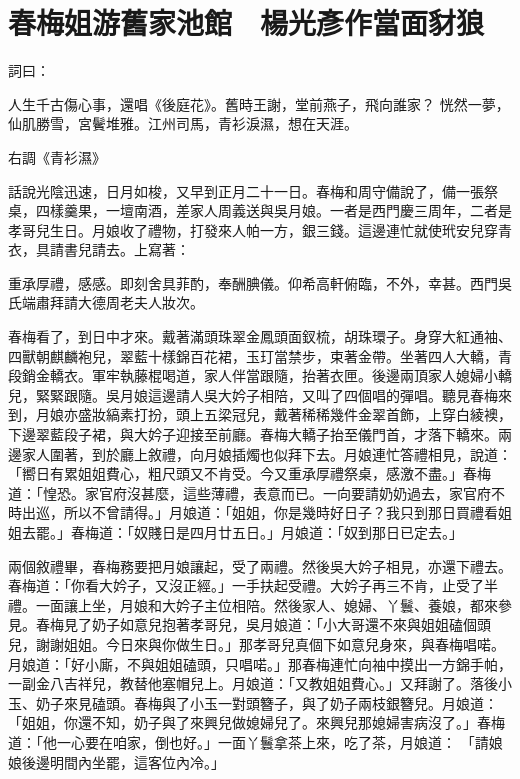 %

\chapter{春梅姐游舊家池館　楊光彥作當面豺狼}

詞曰：

人生千古傷心事，還唱《後庭花》。舊時王謝，堂前燕子，飛向誰家？
恍然一夢，仙肌勝雪，宮鬢堆雅。江州司馬，青衫淚濕，想在天涯。

右調《青衫濕》

話說光陰迅速，日月如梭，又早到正月二十一日。春梅和周守備說了，備一張祭桌，四樣羹果，一壇南酒，差家人周義送與吳月娘。一者是西門慶三周年，二者是孝哥兒生日。月娘收了禮物，打發來人帕一方，銀三錢。這邊連忙就使玳安兒穿青衣，具請書兒請去。上寫著：

重承厚禮，感感。即刻舍具菲酌，奉酬腆儀。仰希高軒俯臨，不外，幸甚。西門吳氏端肅拜請大德周老夫人妝次。

春梅看了，到日中才來。戴著滿頭珠翠金鳳頭面釵梳，胡珠環子。身穿大紅通袖、四獸朝麒麟袍兒，翠藍十樣錦百花裙，玉玎當禁步，束著金帶。坐著四人大轎，青段銷金轎衣。軍牢執藤棍喝道，家人伴當跟隨，抬著衣匣。後邊兩頂家人媳婦小轎兒，緊緊跟隨。吳月娘這邊請人吳大妗子相陪，又叫了四個唱的彈唱。聽見春梅來到，月娘亦盛妝縞素打扮，頭上五梁冠兒，戴著稀稀幾件金翠首飾，上穿白綾襖，下邊翠藍段子裙，與大妗子迎接至前廳。春梅大轎子抬至儀門首，才落下轎來。兩邊家人圍著，到於廳上敘禮，向月娘插燭也似拜下去。月娘連忙答禮相見，說道：「嚮日有累姐姐費心，粗尺頭又不肯受。今又重承厚禮祭桌，感激不盡。」春梅道：「惶恐。家官府沒甚麼，這些薄禮，表意而已。一向要請奶奶過去，家官府不時出巡，所以不曾請得。」月娘道：「姐姐，你是幾時好日子？我只到那日買禮看姐姐去罷。」春梅道：「奴賤日是四月廿五日。」月娘道：「奴到那日已定去。」

兩個敘禮畢，春梅務要把月娘讓起，受了兩禮。然後吳大妗子相見，亦還下禮去。春梅道：「你看大妗子，又沒正經。」一手扶起受禮。大妗子再三不肯，止受了半禮。一面讓上坐，月娘和大妗子主位相陪。然後家人、媳婦、丫鬟、養娘，都來參見。春梅見了奶子如意兒抱著孝哥兒，吳月娘道：「小大哥還不來與姐姐磕個頭兒，謝謝姐姐。今日來與你做生日。」那孝哥兒真個下如意兒身來，與春梅唱喏。月娘道：「好小廝，不與姐姐磕頭，只唱喏。」那春梅連忙向袖中摸出一方錦手帕，一副金八吉祥兒，教替他塞帽兒上。月娘道：「又教姐姐費心。」又拜謝了。落後小玉、奶子來見磕頭。春梅與了小玉一對頭簪子，與了奶子兩枝銀簪兒。月娘道：「姐姐，你還不知，奶子與了來興兒做媳婦兒了。來興兒那媳婦害病沒了。」春梅道：「他一心要在咱家，倒也好。」一面丫鬟拿茶上來，吃了茶，月娘道： 「請娘娘後邊明間內坐罷，這客位內冷。」

